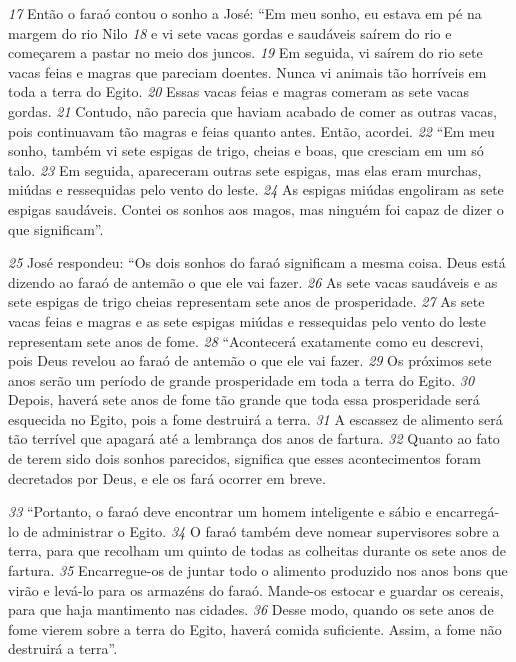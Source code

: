 \bigskip   
\textit{\tiny 17}
Então   o faraó contou o sonho a José: “Em meu sonho, eu estava em pé na
margem do rio Nilo 
\textit{\tiny 18}
e vi sete vacas gordas e saudáveis saírem do rio e
começarem a pastar no meio dos juncos. 
\textit{\tiny 19}
Em seguida, vi saírem do rio sete vacas
feias e magras que pareciam doentes. Nunca vi animais tão horríveis em toda a
terra do Egito. 
\textit{\tiny 20}
Essas vacas feias e magras comeram as sete vacas gordas.
\textit{\tiny 21}
Contudo, não parecia que haviam acabado de comer as outras vacas, pois
continuavam tão magras e feias quanto antes. Então, acordei.
\textit{\tiny 22}
“Em meu sonho, também vi sete espigas de trigo, cheias e boas, que cresciam
em um só talo. 
\textit{\tiny 23}
Em seguida, apareceram outras sete espigas, mas elas eram
murchas, miúdas e ressequidas pelo vento do leste. 
\textit{\tiny 24}
As espigas miúdas
engoliram as sete espigas saudáveis. Contei os sonhos aos magos, mas ninguém
foi capaz de dizer o que significam”.

\bigskip   
\textit{\tiny 25}
José respondeu: “Os dois sonhos do faraó significam a mesma coisa. Deus
está dizendo ao faraó de antemão o que ele vai fazer. 
\textit{\tiny 26}
As sete vacas saudáveis e
as sete espigas de trigo cheias representam sete anos de prosperidade. 
\textit{\tiny 27}
As sete
vacas feias e magras e as sete espigas miúdas e ressequidas pelo vento do leste
representam sete anos de fome.
\textit{\tiny 28}
“Acontecerá exatamente como eu descrevi, pois Deus revelou ao faraó de
antemão o que ele vai fazer. 
\textit{\tiny 29}
Os próximos sete anos serão um período de grande
prosperidade em toda a terra do Egito. 
\textit{\tiny 30}
Depois, haverá sete anos de fome tão
grande que toda essa prosperidade será esquecida no Egito, pois a fome destruirá
a terra. 
\textit{\tiny 31}
A escassez de alimento será tão terrível que apagará até a lembrança dos
anos de fartura. 
\textit{\tiny 32}
Quanto ao fato de terem sido dois sonhos parecidos, significa
que esses acontecimentos foram decretados por Deus, e ele os fará ocorrer em
breve.

\bigskip   
\textit{\tiny 33}
“Portanto, o faraó deve encontrar um homem inteligente e sábio e encarregá-
lo de administrar o Egito. 
\textit{\tiny 34}
O faraó também deve nomear supervisores sobre a
terra, para que recolham um quinto de todas as colheitas durante os sete anos de
fartura. 
\textit{\tiny 35}
Encarregue-os de juntar todo o alimento produzido nos anos bons que
virão e levá-lo para os armazéns do faraó. Mande-os estocar e guardar os cereais,
para que haja mantimento nas cidades. 
\textit{\tiny 36}
Desse modo, quando os sete anos de
fome vierem sobre a terra do Egito, haverá comida suficiente. Assim, a fome não
destruirá a terra”.

